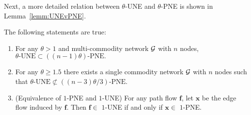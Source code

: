 Next, a more detailed relation between $\theta$-UNE and $\theta$-PNE is shown in Lemma~\ref{lemm:UNEvPNE}. 
\begin{lemma}\label{lemm:UNEvPNE}
	The following statements are true:
	\begin{enumerate}
		\item For any $\theta > 1$ and multi-commodity network $\mathcal{G}$ with $n$ nodes, $\theta\text{-UNE} \subset ((n-1)\theta)\text{-PNE}.$
		\item For any $\theta\geq 1.5$ there exists a single commodity network $\mathcal{G}$ with $n$ nodes such that $\theta\text{-UNE} \not\subset ((n-3)\theta/3)\text{-PNE}.$ 
		\item (Equivalence of $1$-PNE and $1$-UNE)  For any path flow $\bm{f}$, let $\bm{x}$ be the edge flow induced by $\bm{f}$.  Then $\bm{f} \in$ $1$-UNE if and only if $\bm{x} \in$ $1$-PNE.
	\end{enumerate}
\end{lemma}
